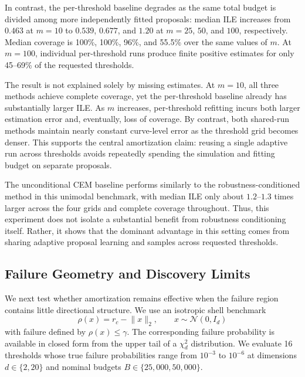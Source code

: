 \documentclass[twoside,11pt]{article}
\begin{document}
In contrast, the per-threshold baseline degrades as the same total budget is divided among more independently fitted proposals: median ILE increases from $0.463$ at $m=10$ to $0.539$, $0.677$, and $1.20$ at $m=25$, $50$, and $100$, respectively. Median coverage is 100\%, 100\%, 96\%, and 55.5\% over the same values of $m$. At $m=100$, individual per-threshold runs produce finite positive estimates for only 45--69\% of the requested thresholds.

The result is not explained solely by missing estimates. At $m=10$, all three methods achieve complete coverage, yet the per-threshold baseline already has substantially larger ILE. As $m$ increases, per-threshold refitting incurs both larger estimation error and, eventually, loss of coverage. By contrast, both shared-run methods maintain nearly constant curve-level error as the threshold grid becomes denser. This supports the central amortization claim: reusing a single adaptive run across thresholds avoids repeatedly spending the simulation and fitting budget on separate proposals.

The unconditional CEM baseline performs similarly to the robustness-conditioned method in this unimodal benchmark, with median ILE only about $1.2$--$1.3$ times larger across the four grids and complete coverage throughout. Thus, this experiment does not isolate a substantial benefit from robustness conditioning itself. Rather, it shows that the dominant advantage in this setting comes from sharing adaptive proposal learning and samples across requested thresholds.

\subsection{Failure Geometry and Discovery Limits}
\label{sec:geometry-results}

We next test whether amortization remains effective when the failure region contains little directional structure. We use an isotropic shell benchmark
\[
    \rho(x) = r_c - \lVert x\rVert_2,
    \qquad
    x \sim \mathcal{N}(0,I_d)
\]
with failure defined by $\rho(x)\leq\gamma$. The corresponding failure probability is available in closed form from the upper tail of a $\chi^2_d$ distribution. We evaluate 16 thresholds whose true failure probabilities range from $10^{-3}$ to $10^{-6}$ at dimensions $d\in\{2,20\}$ and nominal budgets $B\in\{25{,}000,50{,}000\}$.
\end{document}
